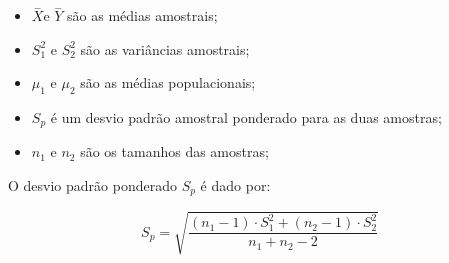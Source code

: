 \documentclass[
]{book}
\providecommand{\tightlist}{%
  \setlength{\itemsep}{0pt}\setlength{\parskip}{0pt}}
\begin{document}
\begin{itemize}
\tightlist
\item
  \(\stackrel{-}{X}\)e \(\stackrel{-}{Y}\) são as médias amostrais;\\
\item
  \(S_{1}^{2}\) e \(S_{2}^{2}\) são as variâncias amostrais;\\
\item
  \(\mu_{1}\) e \(\mu_{2}\) são as médias populacionais;\\
\item
  \(S_{p}\) é um desvio padrão amostral ponderado para as duas amostras;\\
\item
  \(n_{1}\) e \(n_{2}\) são os tamanhos das amostras;
\end{itemize}

\hfill\break

O desvio padrão ponderado \(S_{p}\) é dado por:

\hfill\break

\[
S_{p} =   \sqrt{\frac{(n_{1}-1)\cdot S^{2}_{1} +  (n_{2}-1)\cdot S^{2}_{2}}{n_{1}+n_{2}-2}}
\]\\
\end{document}
